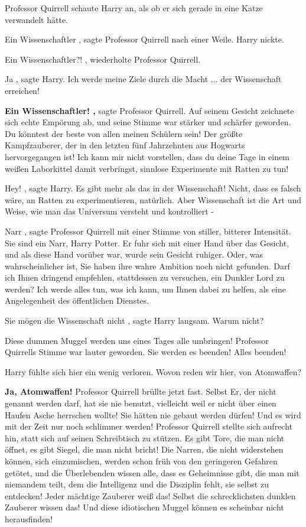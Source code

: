 Professor Quirrell schaute Harry an, als ob er sich gerade in eine Katze
verwandelt hätte.

\glqq Ein Wissenschaftler\grqq{} , sagte Professor Quirrell nach einer Weile.
Harry nickte.

\glqq Ein Wissenschaftler?!\grqq{} , wiederholte Professor Quirrell.

\glqq Ja\grqq{} , sagte Harry. \glqq Ich werde meine Ziele durch die Macht ...
der Wissenschaft erreichen!\grqq{}

\textbf{ \glqq Ein Wissenschaftler!\grqq{} ,} sagte Professor Quirrell. Auf
seinem Gesicht zeichnete sich echte Empörung ab, und seine Stimme war stärker
und schärfer geworden. \glqq Du könntest der beste von allen meinen Schülern
sein! Der größte Kampfzauberer, der in den letzten fünf Jahrzehnten aus Hogwarts
hervorgegangen ist! Ich kann mir nicht vorstellen, dass du deine Tage in einem
weißen Laborkittel damit verbringst, sinnlose Experimente mit Ratten zu
tun!\grqq{}

\glqq Hey!\grqq{} , sagte Harry. \glqq Es gibt mehr als das in der Wissenschaft!
Nicht, dass es falsch wäre, an Ratten zu experimentieren, natürlich. Aber
Wissenschaft ist die Art und Weise, wie man das Universum versteht und
kontrolliert -\grqq{}

\glqq Narr\grqq{} , sagte Professor Quirrell mit einer Stimme von stiller,
bitterer Intensität. \glqq Sie sind ein Narr, Harry Potter.\grqq{} Er fuhr sich
mit einer Hand über das Gesicht, und als diese Hand vorüber war, wurde sein
Gesicht ruhiger. \glqq Oder, was wahrscheinlicher ist, Sie haben ihre wahre
Ambition noch nicht gefunden. Darf ich Ihnen dringend empfehlen, stattdessen zu
versuchen, ein Dunkler Lord zu werden? Ich werde alles tun, was ich kann, um
Ihnen dabei zu helfen, als eine Angelegenheit des öffentlichen Dienstes.\grqq{}

\glqq Sie mögen die Wissenschaft nicht\grqq{} , sagte Harry langsam. \glqq Warum
nicht?\grqq{}

\glqq Diese dummen Muggel werden uns eines Tages alle umbringen!\grqq{}
Professor Quirrells Stimme war lauter geworden. \glqq Sie werden es beenden!
Alles beenden!\grqq{}

Harry fühlte sich hier ein wenig verloren. \glqq Wovon reden wir hier, von
Atomwaffen?\grqq{}

\glqq \textbf{Ja, Atomwaffen!}\grqq{} Professor Quirrell brüllte jetzt fast.
\glqq Selbst Er, der nicht genannt werden darf, hat sie nie benutzt, vielleicht
weil er nicht über einen Haufen Asche herrschen wollte! Sie hätten nie gebaut
werden dürfen! Und es wird mit der Zeit nur noch schlimmer werden!\grqq{}
Professor Quirrell stellte sich aufrecht hin, statt sich auf seinen Schreibtisch
zu stützen. \glqq Es gibt Tore, die man nicht öffnet, es gibt Siegel, die man
nicht bricht! Die Narren, die nicht widerstehen können, sich einzumischen,
werden schon früh von den geringeren Gefahren getötet, und die Überlebenden
wissen alle, dass es Geheimnisse gibt, die man mit niemandem teilt, dem die
Intelligenz und die Disziplin fehlt, sie selbst zu entdecken! Jeder mächtige
Zauberer weiß das! Selbst die schrecklichsten dunklen Zauberer wissen das! Und
diese idiotischen Muggel können es scheinbar nicht herausfinden!

